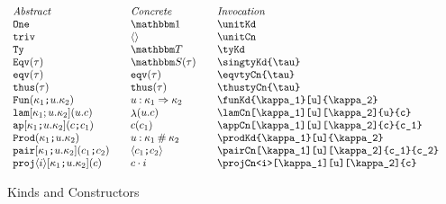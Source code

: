 \documentclass[11pt]{article}
\begin{document}
\begin{figure}

  \begin{displaymath}
    \begin{array}{l@{\qquad}l@{\qquad}l@{\qquad}l}
      \textit{Abstract} & \textit{Concrete} & \textit{Invocation} \\
      \unitKd                  & \unitKd*               & \verb|\unitKd| \\
      \unitCn                  & \unitCn*               & \verb|\unitCn| \\
      \tyKd                    & \tyKd*                 & \verb|\tyKd| \\
      \singtyKd{\tau}          & \singtyKd*{\tau}       & \verb|\singtyKd{\tau}| \\
      \eqvtyCn{\tau}           & \eqvtyCn*{\tau}        & \verb|\eqvtyCn{\tau}| \\
      \thustyCn{\tau}          & \thustyCn*{\tau}       & \verb|\thustyCn{\tau}| \\
      \funKd{\kappa_1}[u]{\kappa_2} & \funKd*{\kappa_1}[u]{\kappa_2} & \verb|\funKd{\kappa_1}[u]{\kappa_2}| \\
      \lamCn[\kappa_1][u][\kappa_2]{u}{c} & \lamCn*{u}{c} & \verb|\lamCn[\kappa_1][u][\kappa_2]{u}{c}| \\
      \appCn[\kappa_1][u][\kappa_2]{c}{c_1} & \appCn*[x][x][x]{c}{c_1} & \verb|\appCn[\kappa_1][u][\kappa_2]{c}{c_1}| \\
      \prodKd{\kappa_1}[u]{\kappa_2} & \prodKd*{\kappa_1}[u]{\kappa_2} & \verb|\prodKd{\kappa_1}[u]{\kappa_2}| \\
      \pairCn[\kappa_1][u][\kappa_2]{c_1}{c_2} & \pairCn*{c_1}{c_2} & \verb|\pairCn[\kappa_1][u][\kappa_2]{c_1}{c_2}| \\
      \projCn<i>[\kappa_1][u][\kappa_2]{c} & \projCn*<i>{c} & \verb|\projCn<i>[\kappa_1][u][\kappa_2]{c}|
      \end{array}
  \end{displaymath}

  \caption{Kinds and Constructors}
  \label{fig:con-knd}
\end{figure}
\end{document}
